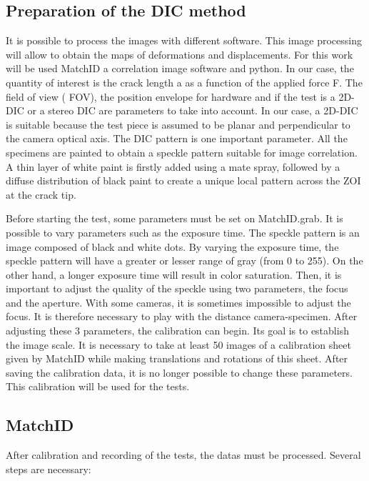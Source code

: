 \subsection{Preparation of the DIC method}

It is possible to process the images with different software. This image processing will allow to obtain the maps of deformations and displacements. For this work will be used MatchID a correlation image software and python.
In our case, the quantity of interest is the crack length a as a function of the applied force F. The field of view ( FOV), the position envelope for hardware and if the test is a 2D-DIC or a stereo DIC are parameters to take into account. In our case, a 2D-DIC is suitable because the test piece is assumed to be planar and perpendicular to the camera optical axis. The DIC pattern is one important parameter. All the specimens are painted to obtain a speckle pattern suitable for image correlation. A thin layer of white paint is firstly added using a mate spray, followed by a diffuse distribution of black paint to create a unique local pattern across the ZOI at the crack tip.

Before starting the test, some parameters must be set on MatchID.grab. It is possible to vary parameters such as the exposure time. The speckle pattern is an image composed of black and white dots. By varying the exposure time, the speckle pattern will have a greater or lesser range of gray (from 0 to 255). On the other hand, a longer exposure time will result in color saturation. Then, it is important to adjust the quality of the speckle using two parameters, the focus and the aperture. With some cameras, it is sometimes impossible to adjust the focus. It is therefore necessary to play with the distance camera-specimen. After adjusting these 3 parameters, the calibration can begin. Its goal is to establish the image scale. It is necessary to take at least 50 images of a calibration sheet given by MatchID while making translations and rotations of this sheet.
After saving the calibration data, it is no longer possible to change these parameters. This calibration will be used for the tests.

\subsection{MatchID}

After calibration and recording of the tests, the datas must be processed. Several steps are necessary:

